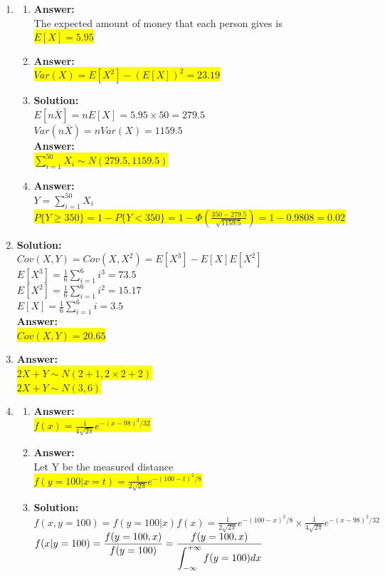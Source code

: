 \documentclass{article}
\newcommand{\myansw}{\textbf{Answer:}\\}
\newcommand{\mysolu}{\textbf{Solution:}\\}
\begin{document}
\begin{enumerate}
\begin{enumerate}
		
		
	\end{enumerate}
	\item
	\begin{enumerate}
	\item
		\myansw
		The expected amount of money that each person gives is\\
		\colorbox{yellow}{${E[X] = 5.95}$}\\
		\item
		\myansw
		\colorbox{yellow}{${Var(X) = E[X^2]-(E[X])^2 = 23.19}$}\\
		\item
		\mysolu
		${E[n\overline{X}]= nE[X]= 5.95 \times 50 =279.5}$\\
		${Var(n\overline{X}) = nVar(X)=1159.5}$\\
		\myansw
		\colorbox{yellow}{${\sum\limits_{i = 1}^{50}X_i \sim N(279.5, 1159.5)}$}\\		
		\item
		\myansw
		${Y = \sum\limits_{i = 1}^{50}X_i}$\\
		\colorbox{yellow}{${P\{Y \geq 350\} = 1 - P\{Y < 350\} = 1 - \Phi(\frac{350 - 279.5}{\sqrt{1159.5}}) = 1 - 0.9808  = 0.02}$}
		

	\end{enumerate}
	\item
	\mysolu 
	${Cov(X,Y) = Cov(X,X^2) = E[X^3] - E[X]E[X^2]}$\\
	$E[X^3] = \frac{1}{6}\sum\limits_{i = 1}^{6}i^3 = 73.5$\\
	$E[X^2] = \frac{1}{6}\sum\limits_{i = 1}^{6}i^2 = 15.17$\\
	$E[X] =\frac{1}{6}\sum\limits_{i = 1}^{6}i = 3.5 $\\
	\myansw
	\colorbox{yellow}{${Cov(X,Y) = 20.65}$}\\
	
	\item 
	\myansw
	\colorbox{yellow}{${2X + Y \sim N(2+1, 2\times 2 + 2)}$}\\
	\colorbox{yellow}{${2X + Y \sim N(3, 6)}$}\\
	\item
	\begin{enumerate}
		\item 
		\myansw
		\colorbox{yellow}{$f(x) = \frac{1}{4\sqrt{2\pi}}e^{-(x-98)^2/32}$}\\
		\item
		\myansw
		Let Y be the measured distance\\
		\colorbox{yellow}{$f(y = 100|x = t) = \frac{1}{2\sqrt{2\pi}}e^{-(100-t)^2/8}$}\\
		\item
		\mysolu
		$f(x, y = 100) =f(y = 100|x )f(x)=\frac{1}{2\sqrt{2\pi}}e^{-(100-x)^2/8}\times \frac{1}{4\sqrt{2\pi}}e^{-(x-98)^2/32} $\\
		$\mathlarger{f(x | y = 100) = \frac{f(y = 100, x)}{f(y = 100)} = \frac{f(y = 100, x)}{\mathlarger{\int_{-\infty}^{+\infty}f(y = 100)dx}}}$\\
	\end{enumerate}
	
	
	
	
	
\end{enumerate}


\newpage
\end{document}
